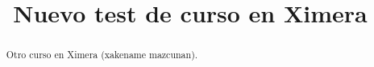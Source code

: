 \documentclass{xourse}
\title{Nuevo test de curso en Ximera}
\begin{document}
  
\begin{abstract} %
Otro curso en Ximera (xakename mazcunan).  
\end{abstract}  
\maketitle  
 
 
\end{document}
